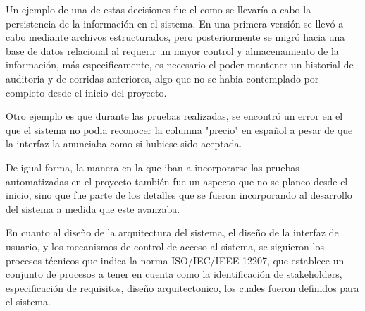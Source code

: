 Un ejemplo de una de estas decisiones fue el como se llevaría a cabo la persistencia de la información en el sistema. En una primera versión se llevó a cabo mediante archivos estructurados, pero posteriormente se migró hacia una base de datos relacional al requerir un mayor control y almacenamiento de la información, más especificamente, es necesario el poder mantener un historial de auditoria y de corridas anteriores, algo que no se habia contemplado por completo desde el inicio del proyecto. 

Otro ejemplo es que durante las pruebas realizadas, se encontró un error en el que el sistema no podia reconocer la columna "precio" en español a pesar de que la interfaz la anunciaba como si hubiese sido aceptada.

De igual forma, la manera en la que iban a incorporarse las pruebas automatizadas en el proyecto también fue un aspecto que no se planeo desde el inicio, sino que fue parte de los detalles que se fueron incorporando al desarrollo del sistema a medida que este avanzaba.

En cuanto al diseño de la arquitectura del sistema, el diseño de la interfaz de usuario, y los mecanismos de control de acceso al sistema, se siguieron los procesos técnicos que indica la norma ISO/IEC/IEEE 12207, que establece un conjunto de procesos a tener en cuenta como la identificación de stakeholders, especificación de requisitos, diseño arquitectonico, los cuales fueron definidos para el sistema.